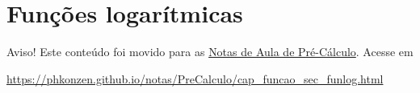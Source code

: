 



\section{Funções logarítmicas}\label{cap_funcao_sec_funlog}

\begin{center}
  Aviso! Este conteúdo foi movido para as \href{https://phkonzen.github.io/notas/PreCalculo/main.html}{Notas de Aula de Pré-Cálculo}. Acesse em

  \url{https://phkonzen.github.io/notas/PreCalculo/cap_funcao_sec_funlog.html}
\end{center}



